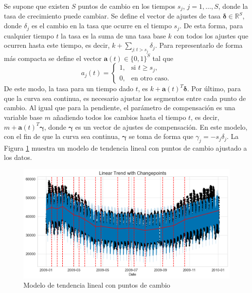 \documentclass[12pt,twoside]{article}
\begin{document}
Se supone que existen $S$ puntos de cambio en los tiempos $s_j$, $j=1,\dotsc, S$, donde la tasa de crecimiento puede cambiar. Se define el vector de ajustes de tasa $\boldsymbol{\delta}\in \mathbb{R}^S$, donde $\delta_j$ es el cambio en la tasa que ocurre en el tiempo $s_j$. De esta forma, para cualquier tiempo $t$ la tasa es la suma de una tasa base $k$ con todos los ajustes que ocurren hasta este tiempo, es decir, $k + \sum_{j: t>s_j} \delta_j$. Para representarlo de forma más compacta se define el vector $\mathbf{a}(t)\in \{0, 1\}^S$ tal que
\begin{equation*}
    a_j(t) = \left\{ \begin{array}{ll}
        1, & \text{si } t\geq s_j,  \\
        0, & \text{en otro caso.}
    \end{array}\right.
\end{equation*}
De este modo, la tasa para un tiempo dado $t$, es $k + \mathbf{a}(t)^T \boldsymbol{\delta}$. Por último, para que la curva sea continua, es necesario ajustar los segmentos entre cada punto de cambio. Al igual que para la pendiente, el parámetro de compensación es una variable base $m$ añadiendo todos los cambios hasta el tiempo $t$, es decir, $m + \mathbf{a}(t)^T\boldsymbol{\gamma}$, donde $\boldsymbol{\gamma}$ es un vector de ajustes de compensación. En este modelo, con el fin de que la curva sea continua, $\boldsymbol{\gamma}$ se toma de forma que $\gamma_j = - s_j\delta_j$. La Figura \ref{fig:changepoints} muestra un modelo de tendencia lineal con puntos de cambio ajustado a los datos.


\begin{center}
\begin{figure}[h]
    \includegraphics[width = \textwidth]{imagenes/changepoints.png}
    \caption{Modelo de tendencia lineal con puntos de cambio}\label{fig:changepoints}
\end{figure}
\end{center}
\end{document}
